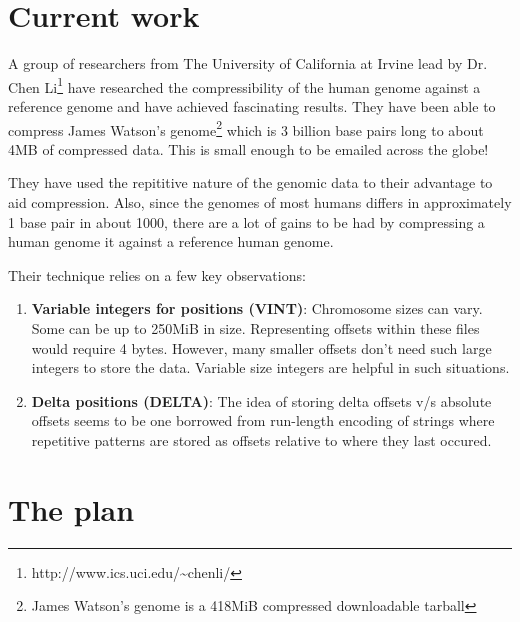 \documentclass[11pt,twocolumn]{article}
\begin{document}
\section*{Current work}

A group of researchers from The University of California at Irvine
lead by Dr. Chen Li\footnote{http://www.ics.uci.edu/\textasciitilde{}chenli/} have
researched the compressibility of the human genome against a reference
genome and have achieved fascinating results\cite{dnazip}. They have been able to
compress James Watson's genome\footnote{James Watson's genome is a
  418MiB compressed downloadable tarball} which is 3 billion base
pairs long to about 4MB of compressed data. This is small enough to be
emailed across the globe!

They have used the repititive nature of the genomic data to their
advantage to aid compression. Also, since the genomes of most humans
differs in approximately 1 base pair in about 1000, there are a lot of
gains to be had by compressing a human genome it against a reference
human genome.

Their technique relies on a few key
observations\cite{genomecompressionchenli}:

\begin{enumerate}

\item \textbf{Variable integers for positions (VINT)}: Chromosome
  sizes can vary. Some can be up to 250MiB in size. Representing
  offsets within these files would require 4 bytes. However, many
  smaller offsets don't need such large integers to store the
  data. Variable size integers are helpful in such situations.

\item \textbf{Delta positions (DELTA)}: The idea of storing delta
  offsets v/s absolute offsets seems to be one borrowed from
  run-length encoding of strings where repetitive patterns are stored
  as offsets relative to where they last occured.

\end{enumerate}

\subsection*{}

\section*{The plan}
\end{document}

